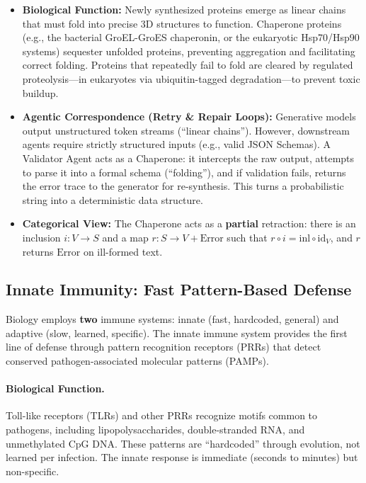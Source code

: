 \begin{itemize}[leftmargin=*]
\item \textbf{Biological Function:} Newly synthesized proteins emerge as linear chains that must fold into
precise 3D structures to function. Chaperone proteins (e.g., the bacterial GroEL-GroES chaperonin, or the
eukaryotic Hsp70/Hsp90 systems) sequester unfolded proteins, preventing aggregation and facilitating correct
folding. Proteins that repeatedly fail to fold are cleared by regulated proteolysis---in eukaryotes via
ubiquitin-tagged degradation---to prevent toxic buildup.
\item \textbf{Agentic Correspondence (Retry \& Repair Loops):} Generative models output unstructured token streams
(``linear chains''). However, downstream agents require strictly structured inputs (e.g., valid JSON Schemas).
A Validator Agent acts as a Chaperone: it intercepts the raw output, attempts to parse it into a formal schema
(``folding''), and if validation fails, returns the error trace to the generator for re-synthesis. This turns a
probabilistic string into a deterministic data structure.
\item \textbf{Categorical View:} The Chaperone acts as a \textbf{partial} retraction: there is an inclusion
$i:V\to S$ and a map $r:S\to V+\mathrm{Error}$ such that $r\circ i=\mathrm{inl}\circ \mathrm{id}_V$, and $r$ returns
$\mathrm{Error}$ on ill-formed text.
\end{itemize}

\subsection{Innate Immunity: Fast Pattern-Based Defense}

Biology employs \textbf{two} immune systems: innate (fast, hardcoded, general) and adaptive (slow, learned,
specific). The innate immune system provides the first line of defense through pattern recognition receptors
(PRRs) that detect conserved pathogen-associated molecular patterns (PAMPs).

\paragraph{Biological Function.}
Toll-like receptors (TLRs) and other PRRs recognize motifs common to pathogens, including lipopolysaccharides,
double-stranded RNA, and unmethylated CpG DNA. These patterns are ``hardcoded'' through evolution, not learned per
infection. The innate response is immediate (seconds to minutes) but non-specific.

